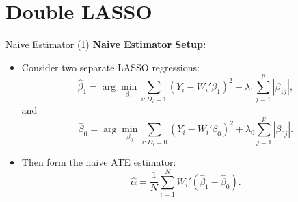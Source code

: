 \documentclass[xcolor=svgnames,t]{beamer}
\begin{document}
            \section{Double LASSO}

            \begin{frame}{Naive Estimator (1)}
                \textbf{Naive Estimator Setup:}
                \begin{itemize}
                    \item Consider two separate LASSO regressions:
                    \[
                    \widehat{\beta}_1 = \arg\min_{\beta_1} \sum_{i:D_i=1}(Y_i - W_i'\beta_1)^2 + \lambda_1 \sum_{j=1}^p |\beta_{1j}|,
                    \]
                    and
                    \[
                    \widehat{\beta}_0 = \arg\min_{\beta_0} \sum_{i:D_i=0}(Y_i - W_i'\beta_0)^2 + \lambda_0 \sum_{j=1}^p |\beta_{0j}|.
                    \]
                
                    \pause
                
                    \item Then form the naive ATE estimator:
                    \[
                    \widehat{\alpha} = \frac{1}{N}\sum_{i=1}^N W_i'(\widehat{\beta}_1 - \widehat{\beta}_0).
                    \]
                \end{itemize}
                \end{frame}
                
\end{document}
